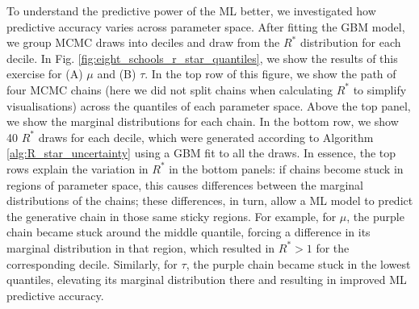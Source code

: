 \documentclass{article}
\begin{document}
To understand the predictive power of the ML better, we investigated how predictive accuracy varies across parameter space. After fitting the GBM model, we group MCMC draws into deciles and draw from the $R^*$ distribution for each decile. In Fig. \ref{fig:eight_schools_r_star_quantiles}, we show the results of this exercise for (A) $\mu$ and (B) $\tau$. In the top row of this figure, we show the path of four MCMC chains (here we did not split chains when calculating $R^*$ to simplify visualisations) across the quantiles of each parameter space. Above the top panel, we show the marginal distributions for each chain. In the bottom row, we show 40 $R^*$ draws for each decile, which were generated according to Algorithm \ref{alg:R_star_uncertainty} using a GBM fit to all the draws. In essence, the top rows explain the variation in $R^*$ in the bottom panels: if chains become stuck in regions of parameter space, this causes differences between the marginal distributions of the chains; these differences, in turn, allow a ML model to predict the generative chain in those same sticky regions. For example, for $\mu$, the purple chain became stuck around the middle quantile, forcing a difference in its marginal distribution in that region, which resulted in $R^*>1$ for the corresponding decile. Similarly, for $\tau$, the purple chain became stuck in the lowest quantiles, elevating its marginal distribution there and resulting in improved ML predictive accuracy.
\end{document}
